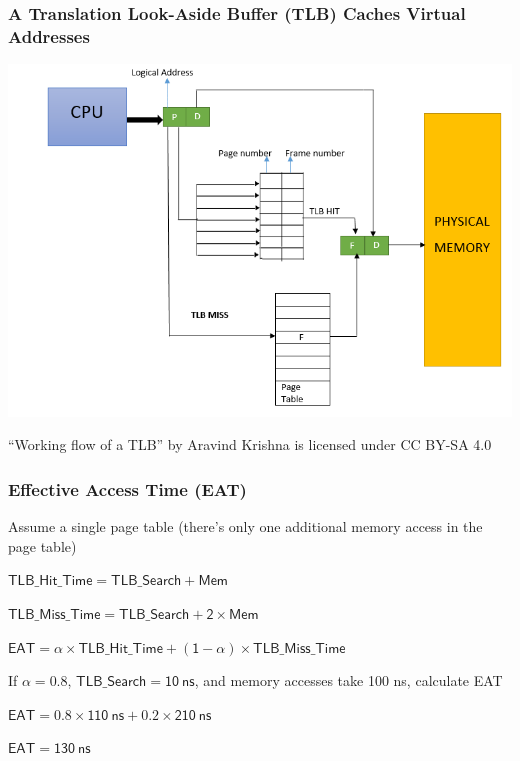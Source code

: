   \begin{frame}
    \frametitle{A Translation Look-Aside Buffer (TLB) Caches Virtual Addresses}

    \begin{center}
    \includegraphics[scale=0.45]{tlb.png}
    \end{center}

    ``Working flow of a TLB'' by Aravind Krishna is licensed under CC BY-SA 4.0
  \end{frame}

  \begin{frame}
    \frametitle{Effective Access Time (EAT)}

    Assume a single page table (there's only one additional memory access in the page table)

    \vspace{2em}

    $\mathsf{TLB\_Hit\_Time = TLB\_Search + Mem}$

    $\mathsf{TLB\_Miss\_Time = TLB\_Search + 2 \times Mem}$

    $\mathsf{EAT = \alpha \times TLB\_Hit\_Time + (1 - \alpha) \times TLB\_Miss\_Time}$

    \vspace{2em}

    If $\mathsf{\alpha = 0.8}$, $\mathsf{TLB\_Search = 10\ ns}$, and memory accesses take 100 ns, calculate EAT

    \hspace{2em} $\mathsf{EAT = 0.8 \times 110\ ns + 0.2 \times 210\ ns}$

    \hspace{2em} $\mathsf{EAT = 130\ ns}$
  \end{frame}

